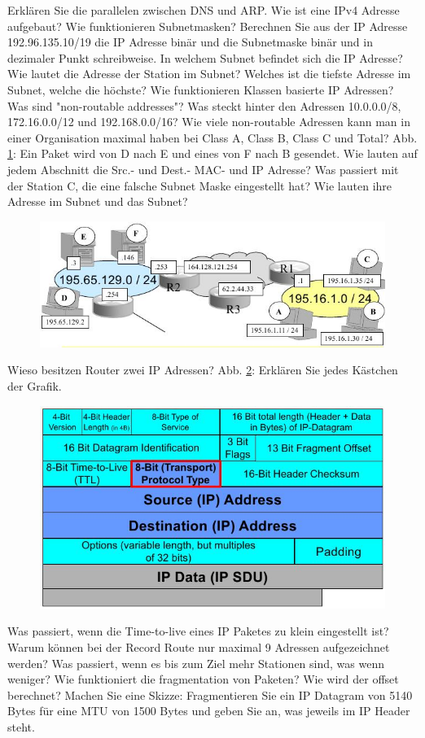 \documentclass[ngerman,a4paper,12pt]{scrreprt}
\begin{document}
\olR
	\li Erklären Sie die parallelen zwischen DNS und ARP.
	\li Wie ist eine IPv4 Adresse aufgebaut? Wie funktionieren Subnetmasken? 
	\li Berechnen Sie aus der IP Adresse 192.96.135.10/19 die IP Adresse binär und die Subnetmaske binär und in dezimaler Punkt schreibweise. In welchem Subnet befindet sich die IP Adresse? Wie lautet die Adresse der Station im Subnet? Welches ist die tiefste Adresse im Subnet, welche die höchste?
	\li Wie funktionieren Klassen basierte IP Adressen?
	\li Was sind "non-routable addresses"? Was steckt hinter den Adressen 10.0.0.0/8, 172.16.0.0/12 und 192.168.0.0/16?
	\li Wie viele non-routable Adressen kann man in einer Organisation maximal haben bei Class A, Class B, Class C und Total?
	\li Abb. \ref{netLayout}: Ein Paket wird von D nach E und eines von F nach B gesendet. Wie lauten auf jedem Abschnitt die Src.- und Dest.- MAC- und IP Adresse? Was passiert mit der Station C, die eine falsche Subnet Maske eingestellt hat? Wie lauten ihre Adresse im Subnet und das Subnet?
	\begin{figure}[H]
		\centering
		\includegraphics[width=\textwidth]{img/R9.1.jpg}
		\caption{}
		\label{netLayout}
	\end{figure}
	\li Wieso besitzen Router zwei IP Adressen?
	\li Abb. \ref{ipDatagram}: Erklären Sie jedes Kästchen der Grafik.
		\begin{figure}[H]
		\centering
		\includegraphics[width=\textwidth]{img/V9.4.jpg}
		\caption{}
		\label{ipDatagram}
	\end{figure}
	\li Was passiert, wenn die Time-to-live eines IP Paketes zu klein eingestellt ist?
	\li Warum können bei der Record Route nur maximal 9 Adressen aufgezeichnet werden? Was passiert, wenn es bis zum Ziel mehr Stationen sind, was wenn weniger?
	\li Wie funktioniert die fragmentation von Paketen? Wie wird der offset berechnet?
	\li Machen Sie eine Skizze: Fragmentieren Sie ein IP Datagram von 5140 Bytes für eine MTU von 1500 Bytes und geben Sie an, was jeweils im IP Header steht.
\olS
\end{document}
